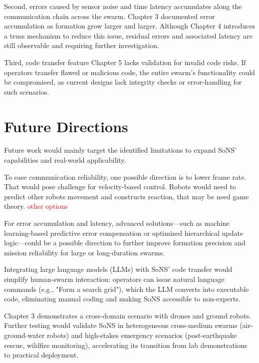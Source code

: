 Second, errors caused by sensor noise and time latency accumulates along the communication chain across the swarm.
Chapter 3 documented error accumulation as formation grow larger and larger.
Although Chapter 4 introduces a truss mechanism to reduce this issue, residual errors and associated latency are still observable and requiring further investigation.

Third, code transfer feature Chapter 5 lacks validation for invalid code risks.
If operators transfer flawed or malicious code, the entire swarm’s functionality could be compromised, as current designs lack integrity checks or error-handling for such scenarios.

\section{Future Directions}

Future work would mainly target the identified limitations to expand SoNS’ capabilities and real-world applicability.

To ease communication reliability, one possible direction is to lower frame rate.
That would pose challenge for velocity-based control.
Robots would need to predict other robots movement and constructs reaction, that may be need game theory.
\textcolor{red}{other options}

For error accumulation and latency, advanced solutions—such as machine learning-based predictive error compensation or optimized hierarchical update logic—could be a possible direction to further improve formation precision and mission reliability for large or long-duration swarms.

Integrating large language models (LLMs) with SoNS’ code transfer would simplify human-swarm interaction: operators can issue natural language commands (e.g., "Form a search grid"), which the LLM converts into executable code, eliminating manual coding and making SoNS accessible to non-experts.

Chapter 3 demonstrates a cross-domain scenario with drones and ground robots.
Further testing would validate SoNS in heterogeneous cross-medium swarms (air-ground-water robots) and high-stakes emergency scenarios (post-earthquake rescue, wildfire monitoring), accelerating its transition from lab demonstrations to practical deployment.